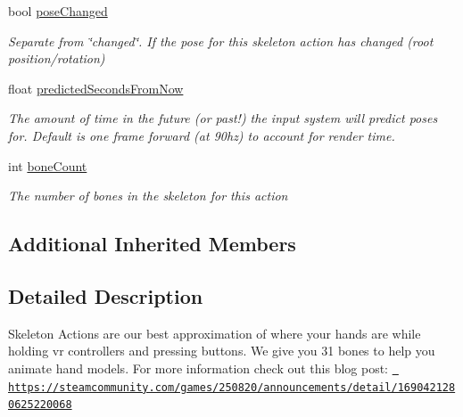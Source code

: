 \begin{DoxyCompactItemize}
bool \mbox{\hyperlink{class_valve_1_1_v_r_1_1_steam_v_r___action___skeleton_a2d53125db8f4a6a5e35a4ec80c9ef445}{pose\+Changed}}
\begin{DoxyCompactList}\small\item\em Separate from \char`\"{}changed\char`\"{}. If the pose for this skeleton action has changed (root position/rotation) \end{DoxyCompactList}\item 
float \mbox{\hyperlink{class_valve_1_1_v_r_1_1_steam_v_r___action___skeleton_aa98e59c1530944c5e570a8de8b430c65}{predicted\+Seconds\+From\+Now}}
\begin{DoxyCompactList}\small\item\em The amount of time in the future (or past!) the input system will predict poses for. Default is one frame forward (at 90hz) to account for render time. \end{DoxyCompactList}\item 
int \mbox{\hyperlink{class_valve_1_1_v_r_1_1_steam_v_r___action___skeleton_adf5378fc6f19da64c07b852be5d9f1ca}{bone\+Count}}
\begin{DoxyCompactList}\small\item\em The number of bones in the skeleton for this action \end{DoxyCompactList}\end{DoxyCompactItemize}
\subsection*{Additional Inherited Members}


\subsection{Detailed Description}
Skeleton Actions are our best approximation of where your hands are while holding vr controllers and pressing buttons. We give you 31 bones to help you animate hand models. For more information check out this blog post\+: \href{https://steamcommunity.com/games/250820/announcements/detail/1690421280625220068}{\texttt{ https\+://steamcommunity.\+com/games/250820/announcements/detail/1690421280625220068}} 



